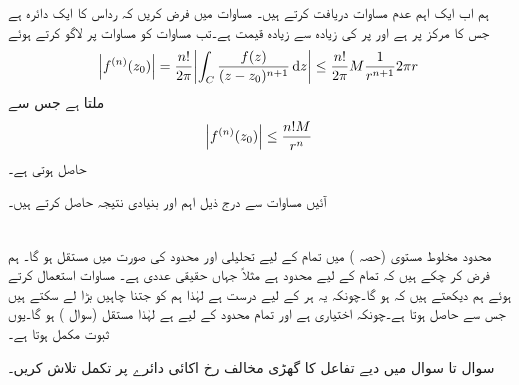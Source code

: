 ہم اب ایک اہم عدم مساوات دریافت کرتے ہیں۔ مساوات  میں فرض کریں کہ  رداس  کا ایک دائرہ ہے جس کا مرکز  پر ہے اور  پر  کی زیادہ سے زیادہ قیمت  ہے۔تب مساوات  کو مساوات  پر لاگو کرتے ہوئے
\begin{align*}
\abs{f^{(n)}(z_0)}=\frac{n!}{2\pi} \abs{\int_C \frac{f(z)}{(z-z_0)^{n+1}}\dif z}\le \frac{n!}{2\pi}M\frac{1}{r^{n+1}}2\pi r
\end{align*}
ملتا ہے جس سے  
\begin{align}\label{مساوات_مخلوط_تکمل_کوشی_عدم_مساوات}
\abs{f^{(n)}(z_0)}\le \frac{n!M}{r^n}
\end{align}
حاصل ہوتی ہے۔

آئیں مساوات  سے درج ذیل اہم اور بنیادی نتیجہ حاصل کرتے ہیں۔

\quad {}\\
محدود مخلوط مستوی (حصہ ) میں تمام  کے لیے تحلیلی  اور محدود  کی صورت میں  مستقل ہو گا۔
\quad
ہم فرض کر چکے ہیں کہ تمام  کے لیے   محدود ہے مثلاً  جہاں  حقیقی عددی ہے۔ مساوات  استعمال کرتے ہوئے ہم دیکھتے ہیں کہ  ہو گا۔چونکہ یہ ہر  کے لیے درست ہے لہٰذا ہم  کو جتنا چاہیں بڑا لے سکتے ہیں جس سے  حاصل ہوتا ہے۔چونکہ  اختیاری ہے اور تمام محدود  کے لیے  ہے لہٰذا  مستقل (سوال ) ہو گا۔یوں ثبوت مکمل ہوتا ہے۔

سوال  تا سوال  میں دیے  تفاعل کا گھڑی مخالف رخ اکائی دائرے پر تکمل تلاش کریں۔

